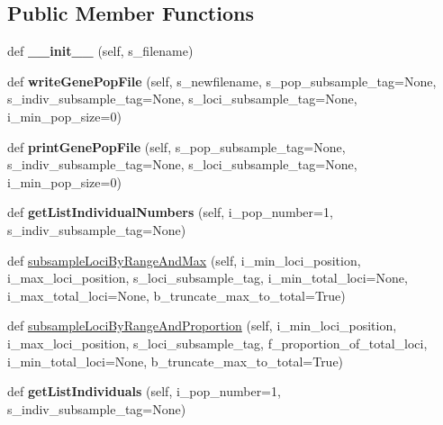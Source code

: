 \subsection*{Public Member Functions}
\begin{DoxyCompactItemize}
\item 
def {\bfseries \+\_\+\+\_\+init\+\_\+\+\_\+} (self, s\+\_\+filename)\hypertarget{classnegui_1_1genepopfilemanager_1_1GenepopFileManager_a8563b3299666d02d45c9acd64f450c51}{}\label{classnegui_1_1genepopfilemanager_1_1GenepopFileManager_a8563b3299666d02d45c9acd64f450c51}

\item 
def {\bfseries write\+Gene\+Pop\+File} (self, s\+\_\+newfilename, s\+\_\+pop\+\_\+subsample\+\_\+tag=None, s\+\_\+indiv\+\_\+subsample\+\_\+tag=None, s\+\_\+loci\+\_\+subsample\+\_\+tag=None, i\+\_\+min\+\_\+pop\+\_\+size=0)\hypertarget{classnegui_1_1genepopfilemanager_1_1GenepopFileManager_a7390cad5840454284e816679a87d84df}{}\label{classnegui_1_1genepopfilemanager_1_1GenepopFileManager_a7390cad5840454284e816679a87d84df}

\item 
def {\bfseries print\+Gene\+Pop\+File} (self, s\+\_\+pop\+\_\+subsample\+\_\+tag=None, s\+\_\+indiv\+\_\+subsample\+\_\+tag=None, s\+\_\+loci\+\_\+subsample\+\_\+tag=None, i\+\_\+min\+\_\+pop\+\_\+size=0)\hypertarget{classnegui_1_1genepopfilemanager_1_1GenepopFileManager_a35aa30c43ab4a5e7762bf8c722314727}{}\label{classnegui_1_1genepopfilemanager_1_1GenepopFileManager_a35aa30c43ab4a5e7762bf8c722314727}

\item 
def {\bfseries get\+List\+Individual\+Numbers} (self, i\+\_\+pop\+\_\+number=1, s\+\_\+indiv\+\_\+subsample\+\_\+tag=None)\hypertarget{classnegui_1_1genepopfilemanager_1_1GenepopFileManager_a652029f0a6e0668e0b75c9683dae0ffd}{}\label{classnegui_1_1genepopfilemanager_1_1GenepopFileManager_a652029f0a6e0668e0b75c9683dae0ffd}

\item 
def \hyperlink{classnegui_1_1genepopfilemanager_1_1GenepopFileManager_ae846be6c9adb2da1346bacaa54b0e2e7}{subsample\+Loci\+By\+Range\+And\+Max} (self, i\+\_\+min\+\_\+loci\+\_\+position, i\+\_\+max\+\_\+loci\+\_\+position, s\+\_\+loci\+\_\+subsample\+\_\+tag, i\+\_\+min\+\_\+total\+\_\+loci=None, i\+\_\+max\+\_\+total\+\_\+loci=None, b\+\_\+truncate\+\_\+max\+\_\+to\+\_\+total=True)
\item 
def \hyperlink{classnegui_1_1genepopfilemanager_1_1GenepopFileManager_a644341072c4d09bbbb1eec4aefbf29f1}{subsample\+Loci\+By\+Range\+And\+Proportion} (self, i\+\_\+min\+\_\+loci\+\_\+position, i\+\_\+max\+\_\+loci\+\_\+position, s\+\_\+loci\+\_\+subsample\+\_\+tag, f\+\_\+proportion\+\_\+of\+\_\+total\+\_\+loci, i\+\_\+min\+\_\+total\+\_\+loci=None, b\+\_\+truncate\+\_\+max\+\_\+to\+\_\+total=True)
\item 
def {\bfseries get\+List\+Individuals} (self, i\+\_\+pop\+\_\+number=1, s\+\_\+indiv\+\_\+subsample\+\_\+tag=None)\hypertarget{classnegui_1_1genepopfilemanager_1_1GenepopFileManager_aa6993dde24163002aeae55005437711d}{}\label{classnegui_1_1genepopfilemanager_1_1GenepopFileManager_aa6993dde24163002aeae55005437711d}


\end{DoxyCompactItemize}
